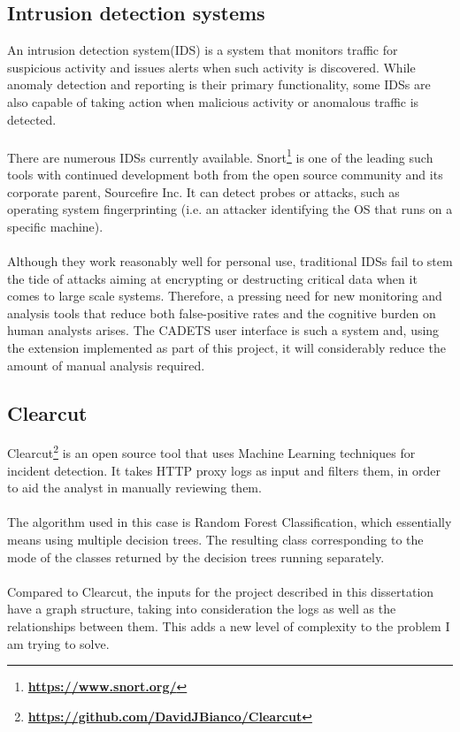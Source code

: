 	\subsection{Intrusion detection systems}
	An intrusion detection system(IDS) is a system that monitors traffic for suspicious activity and issues alerts when such activity is discovered. While anomaly detection and reporting is their primary functionality, some IDSs are also capable of taking action when malicious activity or anomalous traffic is detected. 
	\\ \\
	There are numerous IDSs currently available. Snort\footnote{\textbf{\url{https://www.snort.org/}}} is one of the leading such tools with continued development both from the open source community and its corporate parent, Sourcefire Inc. It can detect probes or attacks, such as operating system fingerprinting (i.e. an attacker identifying the OS that runs on a specific machine). 
	\\ \\
	Although they work reasonably well for personal use, traditional IDSs fail to stem the tide of attacks aiming at encrypting or destructing critical data when it comes to large scale systems. Therefore, a pressing need for new monitoring and analysis tools that reduce both false-positive rates and the cognitive burden on human analysts arises. The CADETS user interface is such a system and, using the extension implemented as part of this project, it will considerably reduce the amount of manual analysis required. 
	
	\subsection{Clearcut}
	Clearcut\footnote{\textbf{\url{https://github.com/DavidJBianco/Clearcut}}} is an open source tool that uses Machine Learning techniques for incident detection. It takes HTTP proxy logs as input and filters them, in order to aid the analyst in manually reviewing them. 
	\\ \\ 
	The algorithm used in this case is Random Forest Classification, which essentially means using multiple decision trees. The resulting class corresponding to the mode of the classes returned by the decision trees running separately. 
	\\ \\
	Compared to Clearcut, the inputs for the project described in this dissertation have a graph structure, taking into consideration the logs as well as the relationships between them. This adds a new level of complexity to the problem I am trying to solve.
	
